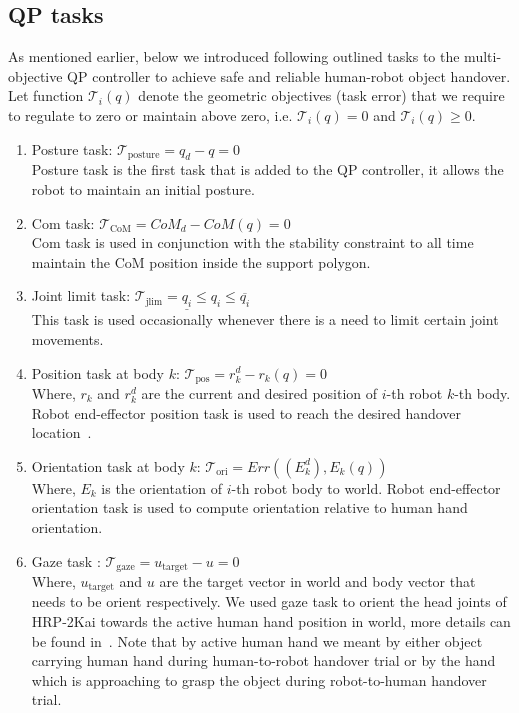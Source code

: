 \subsection{QP tasks}\label{QPTasks}

As mentioned earlier, below we introduced following outlined tasks to the multi-objective QP controller to achieve safe and reliable human-robot object handover. Let function $\mathscr{T}_i(q)$ denote the geometric objectives (task error) that we require to regulate to zero or maintain above zero, i.e. $\mathscr{T}_i(q) = 0$ and $\mathscr{T}_i(q) \geq 0$.  

\begin{enumerate}[start=1,label={\arabic*.}]

\item Posture task: $\mathscr{T}_\text{posture} = q_d - q = 0$\\
Posture task is the first task that is added to the QP controller, it allows the robot to maintain an initial posture.

\item Com task: $\mathscr{T}_\text{CoM} = {CoM}_d - {CoM}(q) = 0$\\
Com task is used in conjunction with the stability constraint to all time maintain the CoM position inside the support polygon. 

\item Joint limit task: $\mathscr{T}_\text{jlim} = \underline{q_i} \leq q_i \leq \overline{q_i}$\\
This task is used occasionally whenever there is a need to limit certain joint movements.  

\item Position task at body $k$: $\mathscr{T}_\text{pos} = r^d_k - r_k(q) = 0$\\
Where, $r_k$ and $r^d_k$ are the current and desired position of $i$-th robot $k$-th body. Robot end-effector position task is used to reach the desired handover location~\cite{ladder-HRP-2Kai}.

\item Orientation task at body $k$: $\mathscr{T}_\text{ori} = Err((E^d_k),  E_k(q))$\\
Where, $E_k$ is the orientation of $i$-th robot body to world. Robot end-effector orientation task is used to compute orientation relative to human hand orientation.

\item Gaze task : $\mathscr{T}_\text{gaze} =u_\text{target} - u = 0$\\
Where, $u_\text{target}$  and $u$ are the target vector in world and body vector that needs to be orient respectively. We used gaze task to orient the head joints of HRP-2Kai towards the active human hand position in world, more details can be found in~\cite{samy2017VecOriTask}. Note that by active human hand we meant by either object carrying human hand during human-to-robot handover trial or by the hand which is approaching to grasp the object during robot-to-human handover trial.

\end{enumerate}



